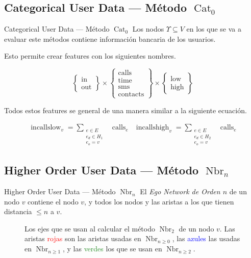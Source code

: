 \documentclass[usenames,dvipsnames,table]{beamer}
\DeclareMathOperator{\calls}{calls}
\DeclareMathOperator{\ego}{Nbr}
\DeclareMathOperator{\cat}{Cat}
\begin{document}
\subsection{Categorical User Data --- Método $\cat_0$}
\begin{frame}{Categorical User Data --- Método $\cat_0$}
	Los nodos $\Upsilon \subseteq V$ en los que se va a evaluar este métodos contiene información bancaria de los usuarios. 

	Esto permite crear features con los siguientes nombres.


	\begin{equation*}
		\begin{Bmatrix} \text{in} \\ \text{out} \end{Bmatrix}
		\times
		\begin{Bmatrix} \text{calls} \\ \text{time} \\ \text{sms} \\ \text{contacts} \end{Bmatrix}
		\times
		\begin{Bmatrix} \text{low} \\ \text{high} \end{Bmatrix}
	\end{equation*}

	Todos estos features se general de una manera similar a la siguiente ecuación.

	\begin{align*}
		\operatorname{incallslow}_v  = \sum_{\substack{e \in E \\ e_d \in H_1 \\ e_o = v}} &\calls_e &
		\operatorname{incallshigh}_v = \sum_{\substack{e \in E \\ e_d \in H_2 \\ e_o = v}} &\calls_e
	\end{align*}
\end{frame}


\subsection{Higher Order User Data --- Método $\ego_n$}
\begin{frame}{Higher Order User Data --- Método $\ego_n$}
	El \emph{Ego Network de Orden $n$} de un nodo $v$ contiene el nodo $v$, y todos los nodos y las aristas a los que tienen distancia $\leq n$ a $v$.

\begin{figure}
	\framebox{%
		
	}
	\caption{Los ejes que se usan al calcular el método $\ego_2$ de un nodo $v$. Las aristas \textcolor{red}{rojas} son las aristas usadas en $\ego_{n \geq 0}$, las \textcolor{blue}{azules} las usadas en $\ego_{n \geq 1}$, y las \textcolor{ForestGreen}{verdes} los que se usan en $\ego_{n \geq 2}$.}
\end{figure}
\end{frame}
\end{document}
